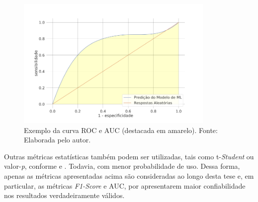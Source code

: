 \begin{figure}
    \centering
    \includegraphics[width=0.85\textwidth]{FIGURES/fig_8.png}
    \caption{Exemplo da curva ROC e AUC (destacada em amarelo). Fonte: Elaborada pelo autor.}
    \label{fig:8}
\end{figure}

Outras métricas estatísticas também podem ser utilizadas, tais como t-\textit{Student} ou valor-\textit{p}, conforme \citet{bib:livroML} e \citet{bib:livroKubat}. Todavia, com menor probabilidade de uso. Dessa forma, apenas as métricas apresentadas acima são consideradas ao longo desta tese e, em particular, as métricas \textit{F1-Score} e AUC, por apresentarem maior confiabilidade nos resultados verdadeiramente válidos.
